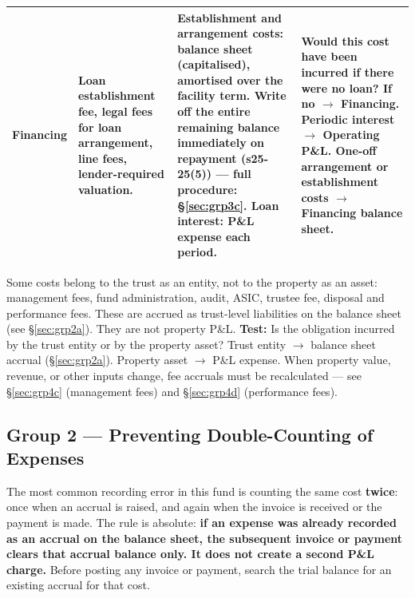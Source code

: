 \documentclass[10pt,a4paper]{article}
\begin{document}
{\begin{longtable}{@{} L{2.2cm} L{3.0cm} L{2.8cm} L{4.7cm} @{}}
\textbf{Financing} & Loan establishment fee, legal fees for loan arrangement, line fees, lender-required valuation. & Establishment and arrangement costs: balance sheet (capitalised), amortised over the facility term. Write off the entire remaining balance immediately on repayment (s25-25(5)) --- full procedure: \S\ref{sec:grp3c}. Loan interest: P\&L expense each period. & Would this cost have been incurred if there were no loan? If no $\to$ Financing. Periodic interest $\to$ Operating P\&L. One-off arrangement or establishment costs $\to$ Financing balance sheet. \\
\bottomrule
\end{longtable}}

\begin{note}
Some costs belong to the trust as an entity, not to the property as an asset: management fees, fund administration, audit, ASIC, trustee fee, disposal and performance fees. These are accrued as trust-level liabilities on the balance sheet (see \S\ref{sec:grp2a}). They are not property P\&L. \textbf{Test:} Is the obligation incurred by the trust entity or by the property asset? Trust entity $\to$ balance sheet accrual (\S\ref{sec:grp2a}). Property asset $\to$ P\&L expense. When property value, revenue, or other inputs change, fee accruals must be recalculated --- see \S\ref{sec:grp4c} (management fees) and \S\ref{sec:grp4d} (performance fees).
\end{note}



\subsection{Group 2 --- Preventing Double-Counting of Expenses}
\label{sec:reclass}

\begin{critical}
The most common recording error in this fund is counting the same cost \textbf{twice}: once when an accrual is raised, and again when the invoice is received or the payment is made. The rule is absolute: \textbf{if an expense was already recorded as an accrual on the balance sheet, the subsequent invoice or payment clears that accrual balance only. It does not create a second P\&L charge.} Before posting any invoice or payment, search the trial balance for an existing accrual for that cost.
\end{critical}
\end{document}
